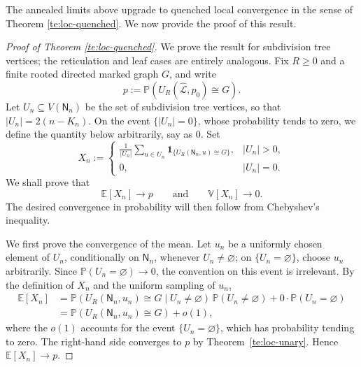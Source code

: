 \documentclass[english,11pt]{smfart}
\newcommand{\Prb}[1]{\mathbb{P}\left(#1\right)}
\newcommand{\Ex}[1]{\mathbb{E}[#1]}
\newcommand{\Va}[1]{\mathbb{V}[#1]}
\newcommand{\convp}{\,{\buildrel \mathrm{p} \over \longrightarrow}\,}
\newcommand{\cL}{\mathcal{L}}
\newcommand{\cR}{\mathcal{R}}
\newcommand{\mN}{\mathsf{N}}
\newtheorem{theorem}{Theorem}[section]
\numberwithin{equation}{section}
\begin{document}
The annealed limits above upgrade to quenched local convergence in the sense of Theorem \ref{te:loc-quenched}. We now provide the proof of this result. 


\begin{proof}[Proof of Theorem \ref{te:loc-quenched}]
We prove the result for subdivision tree vertices; the reticulation and leaf
cases are entirely analogous. Fix \(R\ge0\) and a finite rooted directed marked
graph \(G\), and write
\[
  p:=\Prb{U_R(\hat{\cL},p_0)\cong G}.
\]
Let \(U_n\subseteq V(\mN_n)\) be the set of subdivision tree vertices, so that
\(|U_n|=2(n-K_n)\). On the event \(\{|U_n|=0\}\), whose probability tends to
zero, we define the quantity below arbitrarily, say as \(0\). Set
\[
  X_n:=
  \begin{cases}
  \displaystyle
  \frac{1}{|U_n|}
  \sum_{u\in U_n}
  \mathbf{1}_{\{U_R(\mN_n,u)\cong G\}}, & |U_n|>0,\\[2ex]
  0, & |U_n|=0.
  \end{cases}
\]
We shall prove that
\[
  \Ex{X_n}\to p
  \qquad\text{and}\qquad
  \Va{X_n}\to0.
\]
The desired convergence in probability will then follow from Chebyshev's
inequality.
\smallskip

We first prove the convergence of the mean. Let \(u_n\) be a uniformly chosen
element of \(U_n\), conditionally on \(\mN_n\), whenever \(U_n\ne\varnothing\);
on \(\{U_n=\varnothing\}\), choose \(u_n\) arbitrarily. Since
\(\Prb{U_n=\varnothing}\to0\), the convention on this event is irrelevant. By
the definition of \(X_n\) and the uniform sampling of \(u_n\),
\begin{align*}
  \Ex{X_n}
  &=
  \Prb{U_R(\mN_n,u_n)\cong G\mid U_n\ne\varnothing}\,\Prb{U_n\ne\varnothing}
  +
  0\cdot\Prb{U_n=\varnothing}\\
  &=
  \Prb{U_R(\mN_n,u_n)\cong G}+o(1),
\end{align*}
where the $o(1)$ accounts for the event $\{U_n=\varnothing\}$, which has
probability tending to zero. The right-hand side converges to \(p\) by
Theorem~\ref{te:loc-unary}. Hence \(\Ex{X_n}\to p\).
\smallskip


\end{proof}
\end{document}

